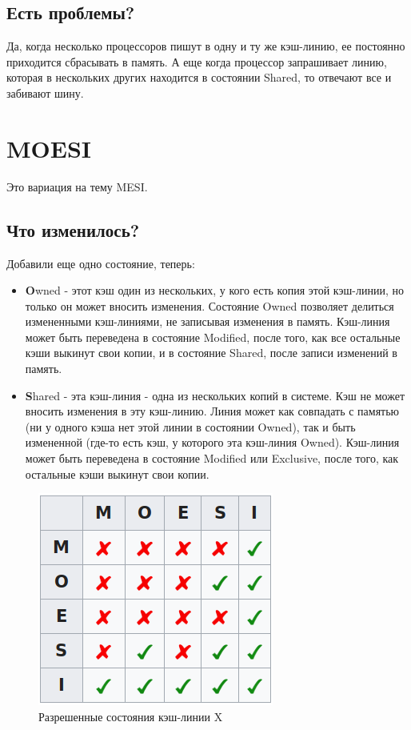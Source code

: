 \documentclass[12pt, a4paper]{article}
\begin{document}
\subsection{Есть проблемы?}
Да, когда несколько процессоров пишут в одну и ту же кэш-линию, ее постоянно приходится сбрасывать в память.
А еще когда процессор запрашивает линию, которая в нескольких других находится в состоянии Shared, то отвечают все и забивают шину.
\section{MOESI}
Это вариация  на тему MESI.
\subsection{Что изменилось?}
Добавили еще одно состояние, теперь:
\begin{itemize}
    \item \textbf{O}wned - этот кэш один из нескольких, у кого есть копия этой кэш-линии, но только он может вносить изменения. Состояние Owned позволяет делиться измененными кэш-линиями, не записывая изменения в память. Кэш-линия может быть переведена в состояние Modified, после того, как все остальные кэши выкинут свои копии, и в состояние Shared, после записи изменений в память.
    \item \textbf{S}hared - эта кэш-линия - одна из нескольких копий в системе. Кэш не может вносить изменения в эту кэш-линию. Линия может как совпадать с памятью (ни у одного кэша нет этой линии в состоянии Owned), так и быть измененной (где-то есть кэш, у которого эта кэш-линия Owned). Кэш-линия может быть переведена в состояние Modified или Exclusive, после того, как остальные кэши выкинут свои копии.
\end{itemize}
\begin{figure}[h]
    \centering
    \includegraphics[scale=0.6]{./images/MOESI.png}
    \caption{Разрешенные состояния кэш-линии X}
    \label{fig:MOESI}
\end{figure}
\end{document}

